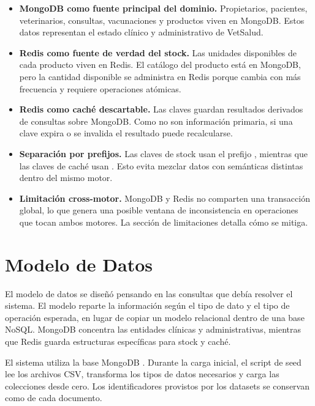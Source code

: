 \documentclass[10pt,a4paper]{article}
\let\oldsection\section
\renewcommand{\section}{\clearpage\oldsection}
\newcommand{\code}[1]{\codeinline{#1}}
\begin{document}
\begin{itemize}
    \item \textbf{MongoDB como fuente principal del dominio.} Propietarios, pacientes, veterinarios, consultas, vacunaciones y productos viven en MongoDB. Estos datos representan el estado clínico y administrativo de VetSalud.

    \item \textbf{Redis como fuente de verdad del stock.} Las unidades disponibles de cada producto viven en Redis. El catálogo del producto está en MongoDB, pero la cantidad disponible se administra en Redis porque cambia con más frecuencia y requiere operaciones atómicas.

    \item \textbf{Redis como caché descartable.} Las claves \code{cache:*} guardan resultados derivados de consultas sobre MongoDB. Como no son información primaria, si una clave expira o se invalida el resultado puede recalcularse.

    \item \textbf{Separación por prefijos.} Las claves de stock usan el prefijo \code{stock:}, mientras que las claves de caché usan \code{cache:}. Esto evita mezclar datos con semánticas distintas dentro del mismo motor.

    \item \textbf{Limitación cross-motor.} MongoDB y Redis no comparten una transacción global, lo que genera una posible ventana de inconsistencia en operaciones que tocan ambos motores. La sección de limitaciones detalla cómo se mitiga.
\end{itemize}

\section{Modelo de Datos}

El modelo de datos se diseñó pensando en las consultas que debía resolver el sistema. El modelo reparte la información según el tipo de dato y el tipo de operación esperada, en lugar de copiar un modelo relacional dentro de una base NoSQL. MongoDB concentra las entidades clínicas y administrativas, mientras que Redis guarda estructuras específicas para stock y caché.

El sistema utiliza la base MongoDB \code{vetsalud}. Durante la carga inicial, el script de seed lee los archivos CSV, transforma los tipos de datos necesarios y carga las colecciones desde cero. Los identificadores provistos por los datasets se conservan como \code{\_id} de cada documento.
\end{document}
